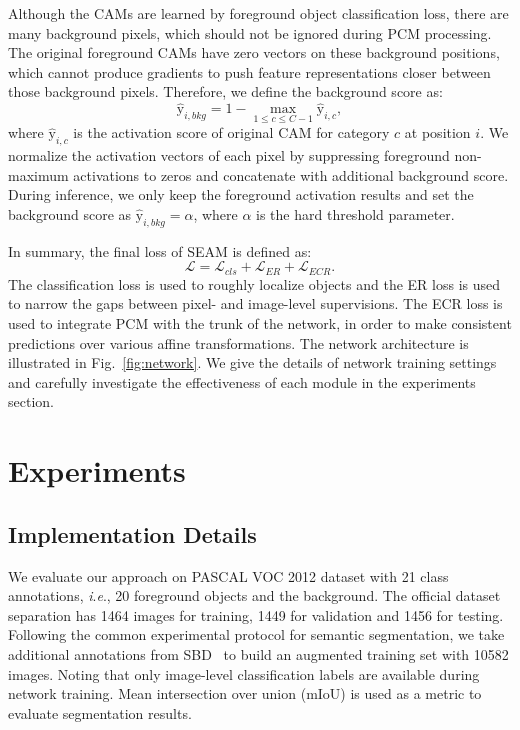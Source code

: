 \documentclass[10pt,twocolumn,letterpaper]{article}
\begin{document}
	Although the CAMs are learned by foreground object classification loss, there are many background pixels, which should not be ignored during PCM processing. The original foreground CAMs have zero vectors on these background positions, which cannot produce gradients to push feature representations closer between those background pixels. Therefore, we define the background score as:
	\begin{equation}
	\hat{\mathrm{y}}_{i,bkg}=1-\max_{1\leq c\leq C-1}\hat{\mathrm{y}}_{i,c},
	\end{equation}
	where $\hat{\mathrm{y}}_{i,c}$ is the activation score of original CAM for category $c$ at position $i$. We normalize the activation vectors of each pixel by suppressing foreground non-maximum activations to zeros and concatenate with additional background score. During inference, we only keep the foreground activation results and set the background score as $\hat{\mathrm{y}}_{i,bkg}=\alpha$, where $\alpha$ is the hard threshold parameter.
	
	In summary, the final loss of SEAM is defined as:
	\begin{equation}
	\mathcal{L} = \mathcal{L}_{cls} + \mathcal{L}_{ER} + \mathcal{L}_{\mathit{ECR}}.
	\end{equation}
	The classification loss is used to roughly localize objects and the ER loss is used to narrow the gaps between pixel- and image-level supervisions. The ECR loss is used to integrate PCM with the trunk of the network, in order to make consistent predictions over various affine transformations. The network architecture is illustrated in Fig.~\ref{fig:network}. We give the details of network training settings and carefully investigate the effectiveness of each module in the experiments section.
	
	\section{Experiments}
	
	\subsection{Implementation Details}
    We evaluate our approach on PASCAL VOC 2012 dataset with 21 class annotations, \textit{i}.\textit{e}., 20 foreground objects and the background. The official dataset separation has 1464 images for training, 1449 for validation and 1456 for testing. Following the common experimental protocol for semantic segmentation, we take additional annotations from SBD~\cite{SBD} to build an augmented training set with 10582 images. Noting that only image-level classification labels are available during network training. Mean intersection over union (mIoU) is used as a metric to evaluate segmentation results.
\end{document}
